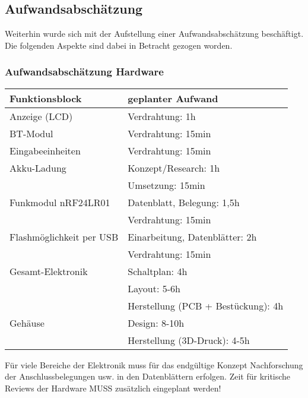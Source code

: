 \subsection{Aufwandsabschätzung}
Weiterhin wurde sich mit der Aufstellung einer Aufwandsabschätzung beschäftigt. Die folgenden Aspekte sind dabei in Betracht gezogen worden.
\subsubsection{Aufwandsabschätzung Hardware}
\begin{tabular}{l|l}
	Funktionsblock & geplanter Aufwand\\
	\hline
	Anzeige (LCD) & Verdrahtung: 1h \\
	\hline
	BT-Modul & Verdrahtung: 15min \\
	\hline
	Eingabeeinheiten & Verdrahtung: 15min \\
	\hline
	Akku-Ladung & Konzept/Research: 1h\\
	& Umsetzung: 15min \\
	\hline
	Funkmodul nRF24LR01 & Datenblatt, Belegung: 1,5h \\
	& Verdrahtung: 15min \\
	\hline
	Flashmöglichkeit per USB & Einarbeitung, Datenblätter: 2h\\
	& Verdrahtung: 15min\\
	\hline
	Gesamt-Elektronik & Schaltplan: 4h\\
	& Layout: 5-6h \\
	& Herstellung (PCB + Bestückung): 4h\\
	\hline
	Gehäuse & Design: 8-10h\\
	& Herstellung (3D-Druck): 4-5h\\
\end{tabular}

Für viele Bereiche der Elektronik muss für das endgültige Konzept Nachforschung der Anschlussbelegungen usw. in den Datenblättern erfolgen. Zeit für kritische Reviews der Hardware MUSS zusätzlich eingeplant werden!

